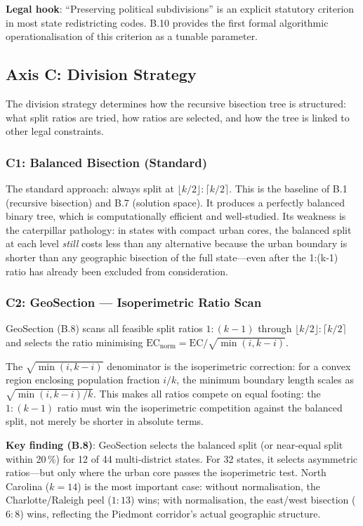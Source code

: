 \textbf{Legal hook}: ``Preserving political subdivisions'' is an explicit
statutory criterion in most state redistricting codes.
B.10 provides the first formal algorithmic operationalisation of this criterion
as a tunable parameter.

\subsection{Axis C: Division Strategy}

The division strategy determines how the recursive bisection tree is structured:
what split ratios are tried, how ratios are selected, and how the tree is
linked to other legal constraints.

\subsubsection*{C1: Balanced Bisection (Standard)}

The standard approach: always split at $\lfloor k/2 \rfloor : \lceil k/2 \rceil$.
This is the baseline of B.1 (recursive bisection) and B.7 (solution space).
It produces a perfectly balanced binary tree, which is computationally efficient
and well-studied.
Its weakness is the caterpillar pathology: in states with compact urban cores,
the balanced split at each level \emph{still} costs less than any alternative
because the urban boundary is shorter than any geographic bisection of the full
state---even after the 1:(k-1) ratio has already been excluded from consideration.

\subsubsection*{C2: GeoSection --- Isoperimetric Ratio Scan}

GeoSection (B.8) scans all feasible split ratios $1:(k-1)$ through
$\lfloor k/2 \rfloor:\lceil k/2 \rceil$ and selects the ratio minimising
$\mathrm{EC}_\text{norm} = \mathrm{EC}/\sqrt{\min(i, k-i)}$.

The $\sqrt{\min(i,k-i)}$ denominator is the isoperimetric correction: for a
convex region enclosing population fraction $i/k$, the minimum boundary length
scales as $\sqrt{\min(i,k-i)/k}$.
This makes all ratios compete on equal footing: the $1:(k-1)$ ratio must win
the isoperimetric competition against the balanced split, not merely be shorter
in absolute terms.

\textbf{Key finding (B.8)}: GeoSection selects the balanced split (or near-equal
split within 20\,\%) for 12 of 44 multi-district states.
For 32 states, it selects asymmetric ratios---but only where the urban core
passes the isoperimetric test.
North Carolina ($k=14$) is the most important case: without normalisation, the
Charlotte/Raleigh peel ($1:13$) wins; with normalisation, the east/west
bisection ($6:8$) wins, reflecting the Piedmont corridor's actual geographic
structure.

